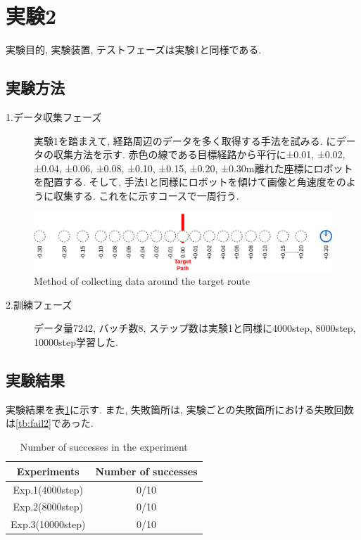 \newpage
\section{実験2}
実験目的, 実験装置, テストフェーズは実験1と同様である.
\subsection{実験方法}
\begin{description}
  \item[1.データ収集フェーズ]実験1を踏まえて, 経路周辺のデータを多く取得する手法を試みる. にデータの収集方法を示す. 赤色の線である目標経路から平行に±0.01, ±0.02, ±0.04, ±0.06, ±0.08, ±0.10, ±0.15, ±0.20, ±0.30m離れた座標にロボットを配置する. そして, 手法1と同様にロボットを傾けて画像と角速度をのように収集する. これをに示すコースで一周行う.  
\end{description}

\begin{figure}[h]
  \centering
  \includegraphics[keepaspectratio, scale=0.18]{images/collect-data.png}
  \caption{Method of collecting data around the target route}
  \label{Fig:collect-data}
  \end{figure}

\begin{description}
  \item[2.訓練フェーズ]データ量7242, バッチ数8, ステップ数は実験1と同様に4000step, 8000step, 10000step学習した. 
\end{description}

\subsection{実験結果}
実験結果を表\ref{tb:exp2}に示す. また, 失敗箇所は, 実験ごとの失敗箇所における失敗回数は\ref{tb:fail2}であった. 

\begin{table}[h]
  \centering
  \begin{tabular}{|c|c|} \hline
    Experiments & Number of successes \\ \hline
    Exp.1(4000step) & 0/10 \\ \hline
    Exp.2(8000step) & 0/10 \\ \hline
    Exp.3(10000step) & 0/10 \\ \hline
  \end{tabular}
  \caption{Number of successes in the experiment}
  \label{tb:exp2}
\end{table}

